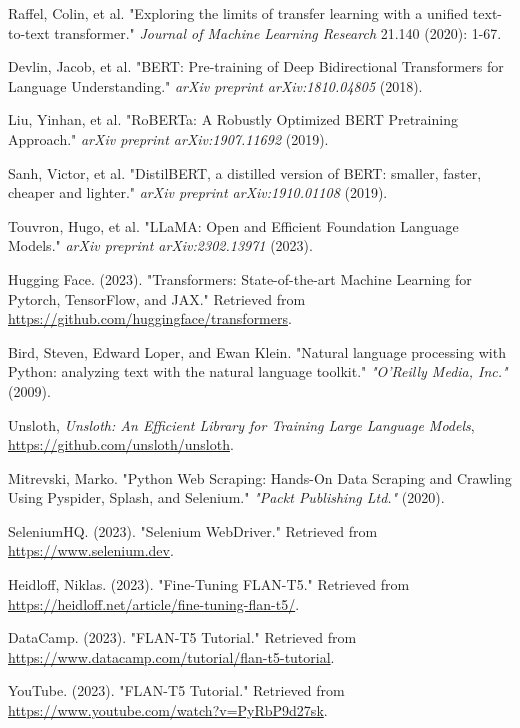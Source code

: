 \documentclass[conference]{IEEEtran}
\begin{document}
\begin{thebibliography}{1}
        Raffel, Colin, et al. "Exploring the limits of transfer learning with a unified text-to-text transformer." \emph{Journal of Machine Learning Research} 21.140 (2020): 1-67.

        Devlin, Jacob, et al. "BERT: Pre-training of Deep Bidirectional Transformers for Language Understanding." \emph{arXiv preprint arXiv:1810.04805} (2018).

        Liu, Yinhan, et al. "RoBERTa: A Robustly Optimized BERT Pretraining Approach." \emph{arXiv preprint arXiv:1907.11692} (2019).

        Sanh, Victor, et al. "DistilBERT, a distilled version of BERT: smaller, faster, cheaper and lighter." \emph{arXiv preprint arXiv:1910.01108} (2019).

        Touvron, Hugo, et al. "LLaMA: Open and Efficient Foundation Language Models." \emph{arXiv preprint arXiv:2302.13971} (2023).

        Hugging Face. (2023). "Transformers: State-of-the-art Machine Learning for Pytorch, TensorFlow, and JAX." Retrieved from \url{https://github.com/huggingface/transformers}.

        Bird, Steven, Edward Loper, and Ewan Klein. "Natural language processing with Python: analyzing text with the natural language toolkit." \emph{"O'Reilly Media, Inc."} (2009).

        Unsloth, \emph{Unsloth: An Efficient Library for Training Large Language Models}, \href{https://github.com/unsloth/unsloth}{https://github.com/unsloth/unsloth}.

        Mitrevski, Marko. "Python Web Scraping: Hands-On Data Scraping and Crawling Using Pyspider, Splash, and Selenium." \emph{"Packt Publishing Ltd."} (2020).

        SeleniumHQ. (2023). "Selenium WebDriver." Retrieved from \url{https://www.selenium.dev}.

        Heidloff, Niklas. (2023). "Fine-Tuning FLAN-T5." Retrieved from \url{https://heidloff.net/article/fine-tuning-flan-t5/}.

        DataCamp. (2023). "FLAN-T5 Tutorial." Retrieved from \url{https://www.datacamp.com/tutorial/flan-t5-tutorial}.

        YouTube. (2023). "FLAN-T5 Tutorial." Retrieved from \url{https://www.youtube.com/watch?v=PyRbP9d27sk}.


\end{thebibliography}
\end{document}
